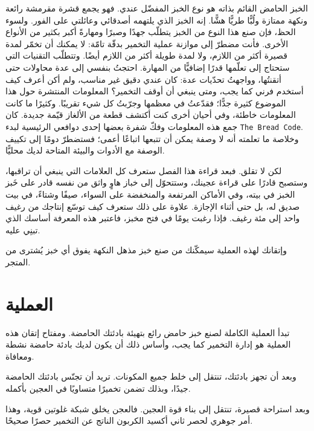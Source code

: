 الخبز الحامض القائم بذاته هو نوع الخبز المفضّل عندي. فهو يجمع قشرة مقرمشة رائعة ونكهة ممتازة ولُبًّا طريًّا هشًّا. إنه الخبز الذي يلتهمه أصدقائي وعائلتي على الفور. ولسوء الحظ، فإن صنع هذا النوع من الخبز يتطلّب جهدًا وصبرًا ومهارةً أكبر بكثير من الأنواع الأخرى. فأنت مضطرّ إلى موازنة عملية التخمير بدقّة تامّة: لا يمكنك أن تخمّر لمدة قصيرة أكثر من اللازم، ولا لمدة طويلة أكثر من اللازم أيضًا. وتتطلّب التقنيات التي ستحتاج إلى تعلّمها قدرًا إضافيًّا من المهارة. احتجتُ بنفسي إلى عدة محاولات حتى أتقنتُها، وواجهتُ تحدّيات عدة: كان عندي دقيق غير مناسب، ولم أكن أعرف كيف أستخدم فرني كما يجب، ومتى ينبغي أن أوقف التخمير؟ المعلومات المنتشرة حول هذا الموضوع كثيرة جدًّا؛ فقدّعتُ في معظمها وجرّبتُ كل شيء تقريبًا. وكثيرًا ما كانت المعلومات خاطئة، وفي أحيان أخرى كنت أكتشف قطعة من الألغاز قيّمة جديدة. كان جمع هذه المعلومات وفكّ شفرة بعضها إحدى دوافعي الرئيسية لبدء \textenglish{\texttt{The Bread Code}}. وخلاصة ما تعلمته أنه لا وصفة يمكن أن تتبعها اتباعًا أعمى؛ فستضطرّ دومًا إلى تكييف الوصفة مع الأدوات والبيئة المتاحة لديك محليًّا.

لكن لا تقلق. فبعد قراءة هذا الفصل ستعرف كل العلامات التي ينبغي أن تراقبها، وستصبح قادرًا على قراءة عجينك، وستتحوّل إلى خباز هاوٍ واثق من نفسه قادر على خَبز الخبز في بيته، وفي الأماكن المرتفعة والمنخفضة على السواء، صيفًا وشتاءً، في بيت صديق له، بل حتى أثناء الإجازة. علاوة على ذلك ستعرف كيف توسّع إنتاجك من رغيف واحد إلى مئة رغيف. فإذا رغبت يومًا في فتح مخبز، فاعتبر هذه المعرفة أساسك الذي تبنِي عليه.

وإتقانك لهذه العملية سيمكّنك من صنع خبز مذهل النكهة يفوق أي خبز يُشترى من المتجر.

\section{العملية}

\begin{flowchart}[!htb]

\caption[العملية النموذجية لصنع خبز حامض قمحي]{العملية النموذجية لصنع خبز حامض قمحي.}
\label{fig:wheat-sourdough-process}
\end{flowchart}

تبدأ العملية الكاملة لصنع خبز حامض رائع بتهيئة بادئتك الحامضة. ومفتاح إتقان هذه العملية هو إدارة التخمير كما يجب، وأساس ذلك أن يكون لديك بادئة حامضة نشطة ومعافاة.

وبعد أن تجهز بادئتك، تنتقل إلى خلط جميع المكونات. تريد أن تجنّس بادئتك الحامضة جيدًا، وبذلك تضمن تخميرًا متساويًا في العجين بأكمله.

وبعد استراحة قصيرة، تنتقل إلى بناء قوة العجين. فالعجن يخلق شبكة غلوتين قوية، وهذا أمر جوهري لحصر ثاني أكسيد الكربون  الناتج عن التخمير حصرًا صحيحًا.

